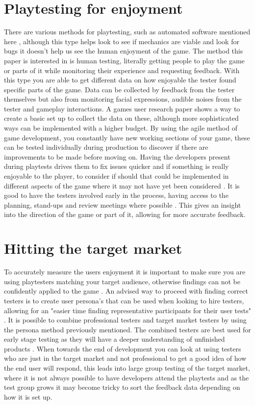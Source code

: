 \documentclass{scrartcl}
\begin{document}
	\section{Playtesting for enjoyment}
	There are various methods for playtesting, such as automated software mentioned here \cite{powley2016semi}, although this type helps look to see if mechanics are viable and look for bugs it doesn't help us see the human enjoyment of the game. The method this paper is interested in is human testing, literally getting people to play the game or parts of it while monitoring their experience and requesting feedback. With this type you are able to get different data on how enjoyable the tester found specific parts of the game. Data can be collected by feedback from the tester themselves but also from monitoring facial expressions, audible noises from the tester and gameplay interactions. A games user research \cite{moosajee2016games} paper shows a way to create a basic set up to collect the data on these, although more sophisticated ways can be implemented with a higher budget. By using the agile method of game development, you constantly have new working sections of your game, these can be tested individually during production to discover if there are improvements to be made before moving on. Having the developers present during playtests drives them to fix issues quicker and if something is really enjoyable to the player, to consider if should that could be implemented in different aspects of the game where it may not have yet been considered \cite{moosajee2016games}. It is good to have the testers involved early in the process, having access to the planning, stand-ups and review meetings where possible \cite{cruzes2016communication}. This gives an insight into the direction of the game or part of it, allowing for more accurate feedback.
	
	\section{Hitting the target market}
	To accurately measure the users enjoyment it is important to make sure you are using playtesters matching your target audience, otherwise findings can not be confidently applied to the game \cite{moosajee2016games}. An advised way to proceed with finding correct testers is to create user persona's that can be used when looking to hire testers, allowing for an "easier time finding representative participants for their user tests" \cite[p.3163]{moosajee2016games}. It is possible to combine professional testers and target market testers by using the persona method previously mentioned. The combined testers are best used for early stage testing as they will have a deeper understanding of unfinished products \cite{ollila2008using}. When towards the end of development you can look at using testers who are just in the target market and not professional to get a good idea of how the end user will respond, this leads into large group testing of the target market, where it is not always possible to have developers attend the playtests and as the test group grows it may become tricky to sort the feedback data depending on how it is set up.
	
\end{document}

